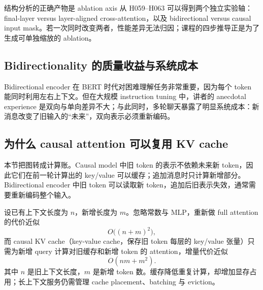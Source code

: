

\begin{importantbox}{结构分析的正确产物是 ablation axis}
从 H059--H063 可以得到两个独立实验轴：final-layer versus layer-aligned cross-attention，以及 bidirectional versus causal input mask。若一次同时改变两者，性能差异无法归因；课程的四步推导正是为了生成可单独缩放的 ablation。
\end{importantbox}

\subsection{Bidirectionality 的质量收益与系统成本}

Bidirectional encoder 在 BERT 时代对困难理解任务非常重要，因为每个 token 能同时利用左右上下文。但在大规模 instruction tuning 中，讲者的 anecdotal experience 是双向与单向差异不大；与此同时，多轮聊天暴露了明显系统成本：新消息改变了旧输入的“未来”，双向表示必须重新编码。



\subsection{为什么 causal attention 可以复用 KV cache}

本节把图转成计算账。Causal model 中旧 token 的表示不依赖未来新 token，因此它们在前一轮计算出的 key/value 可以缓存；追加消息时只计算新增部分。Bidirectional encoder 中旧 token 可以读取新 token，追加后旧表示失效，通常需要重新编码整个输入。


设已有上下文长度为 $n$，新增长度为 $m$。忽略常数与 MLP，重新做 full attention 的代价近似
\[
O\bigl((n+m)^2\bigr),
\]
而 causal KV cache（key-value cache，保存旧 token 每层的 key/value 张量）只需为新增 query 计算对旧缓存和新增 token 的 attention，增量代价近似
\[
O(nm+m^2).
\]
其中 $n$ 是旧上下文长度，$m$ 是新增 token 数。缓存降低重复计算，却增加显存占用；长上下文服务仍需管理 cache placement、batching 与 eviction。

